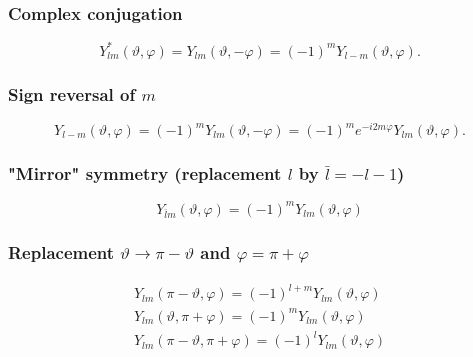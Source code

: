 \subsubsection{Complex conjugation}
\begin{equation}
Y_{l m}^{*}(\vartheta, \varphi)=Y_{l m}(\vartheta,-\varphi)=(-1)^{m} Y_{l-m}(\vartheta, \varphi) . \label{eq:5:4:1}
\end{equation}
\subsubsection{Sign reversal of $m$}
\begin{equation}
Y_{l-m}(\vartheta, \varphi)=(-1)^{m} Y_{l m}(\vartheta,-\varphi)=(-1)^{m} e^{-i 2 m \varphi} Y_{l m}(\vartheta, \varphi) . \label{eq:5:4:2}
\end{equation}
\subsubsection{"Mirror" symmetry (replacement $l$ by $\bar{l}=-l-1$)}
\begin{equation}
Y_{\bar{l} m}(\vartheta, \varphi)=(-1)^{m} Y_{l m}(\vartheta, \varphi) \label{eq:5:4:3}
\end{equation}
\subsubsection{Replacement $\vartheta \rightarrow \pi-\vartheta$ and $\varphi=\pi+\varphi$}
\begin{gather}
Y_{l m}(\pi-\vartheta, \varphi)=(-1)^{l+m} Y_{l m}(\vartheta, \varphi)  \label{eq:5:4:4}\\
Y_{l m}(\vartheta, \pi+\varphi)=(-1)^{m} Y_{l m}(\vartheta, \varphi)  \label{eq:5:4:5}\\
Y_{l m}(\pi-\vartheta, \pi+\varphi)=(-1)^{l} Y_{l m}(\vartheta, \varphi) \label{eq:5:4:6}
\end{gather}

